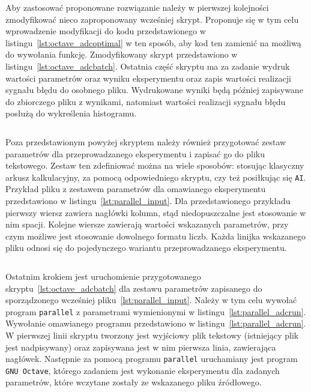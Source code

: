 Aby zastosować proponowane rozwiązanie należy w pierwszej kolejności zmodyfikować nieco zaproponowany wcześniej skrypt. Proponuje się w tym celu wprowadzenie modyfikacji do kodu przedstawionego w listingu~\ref{lst:octave_adcoptimal} w ten sposób, aby kod ten zamienić na możliwą do wywołania funkcję. Zmodyfikowany skrypt przedstawiono w listingu~\ref{lst:octave_adcbatch}. Ostatnia część skryptu ma za zadanie wydruk wartości parametrów oraz wyniku eksperymentu oraz zapis wartości realizacji sygnału błędu do osobnego pliku. Wydrukowane wyniki będą później zapisywane do zbiorczego pliku z wynikami, natomiast wartości realizacji sygnału błędu posłużą do wykreślenia histogramu.

\begin{listing}[htb]
\inputminted{octave}{skrypty/octave_adcbatch.m}
\end{listing}

Poza przedstawionym powyżej skryptem należy również przygotować zestaw parametrów dla przeprowadzanego eksperymentu i zapisać go do pliku tekstowego. Zestaw ten zdefiniować można na wiele sposobów: stosując klasyczny arkusz kalkulacyjny, za pomocą odpowiedniego skryptu, czy też posiłkując się \texttt{AI}. Przykład pliku z zestawem parametrów dla omawianego eksperymentu przedstawiono w listingu~\ref{lst:parallel_input}. Dla przedstawionego przykładu pierwszy wiersz zawiera nagłówki kolumn, stąd niedopuszczalne jest stosowanie w nim spacji. Kolejne wiersze zawierają wartości wskazanych parametrów, przy czym możliwe jest stosowanie dowolnego formatu liczb. Każda linijka wskazanego pliku odnosi się do pojedynczego wariantu przeprowadzanego eksperymentu.

\begin{listing}[htb]
\inputminted{text}{skrypty/parallel_input.csv}
\end{listing}

Ostatnim krokiem jest uruchomienie przygotowanego skryptu~\ref{lst:octave_adcbatch} dla zestawu parametrów zapisanego do sporządzonego wcześniej pliku~\ref{lst:parallel_input}. Należy w tym celu wywołać program \texttt{parallel} z parametrami wymienionymi w listingu~\ref{lst:parallel_adcrun}. Wywołanie omawianego programu przedstawiono w listingu~\ref{lst:parallel_adcrun}. W pierwszej linii skryptu tworzony jest wyjściowy plik tekstowy (istniejący plik jest nadpisywany) oraz zapisywana jest w nim pierwsza linia, zawierająca nagłówek. Następnie za pomocą programu \texttt{parallel} uruchamiany jest program \texttt{GNU Octave}, którego zadaniem jest wykonanie eksperymentu dla zadanych parametrów, które wczytane zostały ze wskazanego pliku źródłowego.

